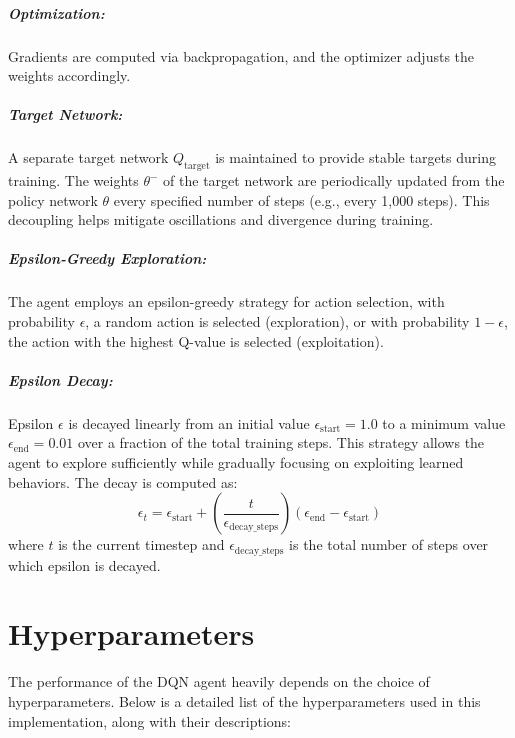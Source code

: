 \documentclass[
12pt, %
oneside, %
english, %
onehalfspacing, %
nolistspacing, %
liststotoc, %
headsepline, %
]{ProposalAndThesis} %
\begin{document}
\paragraph{Optimization:} Gradients are computed via backpropagation, and the optimizer adjusts the weights accordingly.

\paragraph{Target Network:}
A separate target network \( Q_{\text{target}} \) is maintained to provide stable targets during training. The weights \( \theta^- \) of the target network are periodically updated from the policy network \( \theta \) every specified number of steps (e.g., every 1,000 steps). This decoupling helps mitigate oscillations and divergence during training.

\paragraph{Epsilon-Greedy Exploration:}
The agent employs an epsilon-greedy strategy for action selection, with probability \( \epsilon \), a random action is selected (exploration), or with probability \( 1 - \epsilon \), the action with the highest Q-value is selected (exploitation).

\paragraph{Epsilon Decay:} Epsilon \( \epsilon \) is decayed linearly from an initial value \( \epsilon_{\text{start}} = 1.0 \) to a minimum value \( \epsilon_{\text{end}} = 0.01 \) over a fraction of the total training steps. This strategy allows the agent to explore sufficiently while gradually focusing on exploiting learned behaviors.
The decay is computed as:
\[
\epsilon_t = \epsilon_{\text{start}} + \left( \frac{t}{\epsilon_{\text{decay\_steps}}} \right) (\epsilon_{\text{end}} - \epsilon_{\text{start}})
\]
where \( t \) is the current timestep and \( \epsilon_{\text{decay\_steps}} \) is the total number of steps over which epsilon is decayed.






\chapter{Hyperparameters}
The performance of the DQN agent heavily depends on the choice of hyperparameters. Below is a detailed list of the hyperparameters used in this implementation, along with their descriptions:
\end{document}
